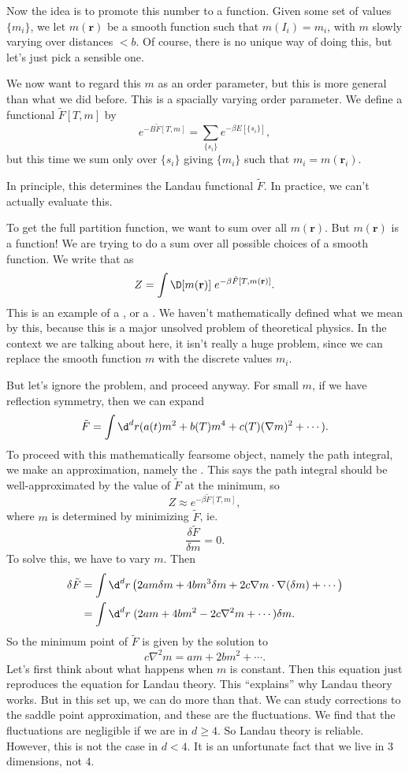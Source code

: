 \documentclass[a4paper]{article}
\begin{document}
Now the idea is to promote this number to a function. Given some set of values $\{m_i\}$, we let $m(\mathbf{r})$ be a smooth function such that $m(I_i) = m_i$, with $m$ slowly varying over distances $ < b$. Of course, there is no unique way of doing this, but let's just pick a sensible one.

We now want to regard this $m$ as an order parameter, but this is more general than what we did before. This is a spacially varying order parameter. We define a functional $\tilde{F}[T, m]$ by
\[
  e^{-B \tilde{F}[T, m]} = \sum_{\{s_i\}} e^{-\beta E[\{s_i\}]},
\]
but this time we sum only over $\{s_i\}$ giving $\{m_i\}$ such that $m_i = m(\mathbf{r}_i)$.

In principle, this determines the Landau functional $\tilde{F}$. In practice, we can't actually evaluate this.

To get the full partition function, we want to sum over all $m(\mathbf{r})$. But $m(\mathbf{r})$ is a function! We are trying to do a sum over all possible choices of a smooth function. We write that as
\[
  Z = \int \D [m(\mathbf{r})]\; e^{-\beta \tilde{F}[T, m(\mathbf{r})]}.
\]
This is an example of a , or a . We haven't mathematically defined what we mean by this, because this is a major unsolved problem of theoretical physics. In the context we are talking about here, it isn't really a huge problem, since we can replace the smooth function $m$ with the discrete values $m_i$.

But let's ignore the problem, and proceed anyway. For small $m$, if we have reflection symmetry, then we can expand
\[
  \tilde{F} = \int \d^d r (a(t) m^2 + b(T) m^4 + c(T) (\nabla m)^2 + \cdots).
\]
To proceed with this mathematically fearsome object, namely the path integral, we make an approximation, namely the . This says the path integral should be well-approximated by the value of $\tilde{F}$ at the minimum, so
\[
  Z \approx e^{-\beta \tilde{F}[T, m]},
\]
where $m$ is determined by minimizing $\tilde{F}$, ie.
\[
  \frac{\delta \tilde{F}}{\delta m} = 0.
\]
To solve this, we have to vary $m$. Then
\begin{align*}
  \delta \tilde{F} &= \int \d^d r\left(2a m\delta m + 4b m^3\delta m + 2c \nabla m \cdot \nabla (\delta m) + \cdots\right)\\
  &= \int \d^d r\; (2am + 4b m^2 - 2c \nabla^2 m + \cdots) \delta m.
\end{align*}
So the minimum point of $\tilde{F}$ is given by the solution to
\[
  c \nabla^2 m = am + 2b m^2 + \cdots .\tag{$*$}
\]
Let's first think about what happens when $m$ is constant. Then this equation just reproduces the equation for Landau theory. This ``explains'' why Landau theory works. But in this set up, we can do more than that. We can study corrections to the saddle point approximation, and these are the fluctuations. We find that the fluctuations are negligible if we are in $d \geq 4$. So Landau theory is reliable. However, this is not the case in $d < 4$. It is an unfortunate fact that we live in $3$ dimensions, not $4$.
\end{document}
